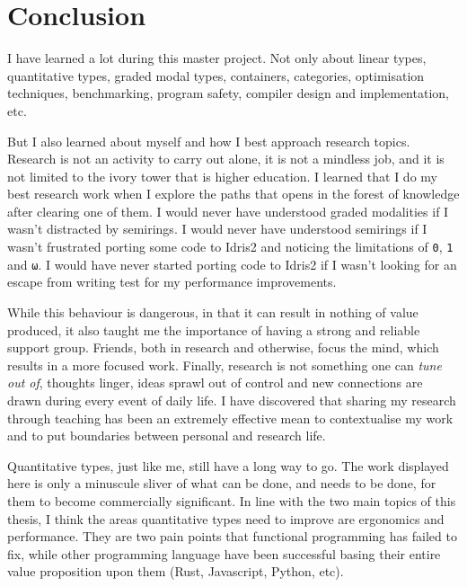 \documentclass[
]{article}
\begin{document}
\newpage

\hypertarget{conclusion}{%
\section{Conclusion}\label{conclusion}}

I have learned a lot during this master project. Not only about linear
types, quantitative types, graded modal types, containers, categories,
optimisation techniques, benchmarking, program safety, compiler design
and implementation, etc.

But I also learned about myself and how I best approach research topics.
Research is not an activity to carry out alone, it is not a mindless
job, and it is not limited to the ivory tower that is higher education.
I learned that I do my best research work when I explore the paths that
opens in the forest of knowledge after clearing one of them. I would
never have understood graded modalities if I wasn't distracted by
semirings. I would never have understood semirings if I wasn't
frustrated porting some code to Idris2 and noticing the limitations of
\texttt{0}, \texttt{1} and \texttt{ω}. I would have never started
porting code to Idris2 if I wasn't looking for an escape from writing
test for my performance improvements.

While this behaviour is dangerous, in that it can result in nothing of
value produced, it also taught me the importance of having a strong and
reliable support group. Friends, both in research and otherwise, focus
the mind, which results in a more focused work. Finally, research is not
something one can \emph{tune out of}, thoughts linger, ideas sprawl out
of control and new connections are drawn during every event of daily
life. I have discovered that sharing my research through teaching has
been an extremely effective mean to contextualise my work and to put
boundaries between personal and research life.

Quantitative types, just like me, still have a long way to go. The work
displayed here is only a minuscule sliver of what can be done, and needs
to be done, for them to become commercially significant. In line with
the two main topics of this thesis, I think the areas quantitative types
need to improve are ergonomics and performance. They are two pain points
that functional programming has failed to fix, while other programming
language have been successful basing their entire value proposition upon
them (Rust, Javascript, Python, etc).
\end{document}
